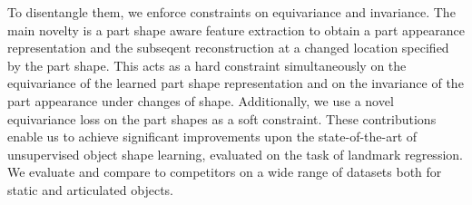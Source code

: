 To disentangle them, we enforce constraints on equivariance and invariance.
%
The main novelty is a part shape aware feature extraction to obtain a part appearance representation and the subseqent reconstruction at a changed location specified by the part shape.
This acts as a hard constraint simultaneously on the equivariance of the learned part shape representation and on the invariance of the part appearance under changes of shape.
Additionally, we use a novel equivariance loss on the part shapes as a soft constraint.
These contributions enable us to achieve significant improvements upon the state-of-the-art of unsupervised object shape learning, evaluated on the task of landmark regression.
We evaluate and compare to competitors on a wide range of datasets both for static and articulated objects.
